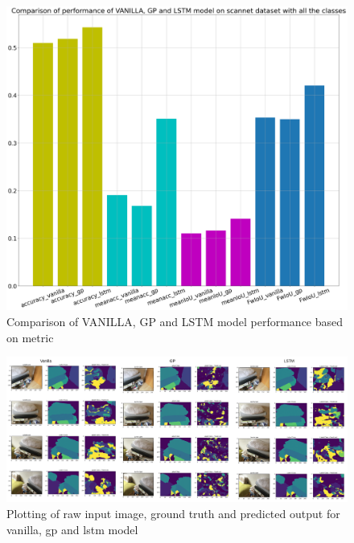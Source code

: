 	\begin{figure}
		\centering
		\includegraphics[width=12cm]{images/scannet_performance_all_classes.png}
		\caption{Comparison of VANILLA, GP and LSTM model performance based on metric}
		\label{fig:unet_model_metric_comparison_all_classes}
	\end{figure}
	
	\begin{figure}
		\centering
		\includegraphics[width=16cm]{images/unet_scannet_all_classes.png}
		\caption{Plotting of raw input image, ground truth and predicted output for vanilla, gp and lstm model}
		\label{fig:unet_model}
	\end{figure}

	\newpage
		
